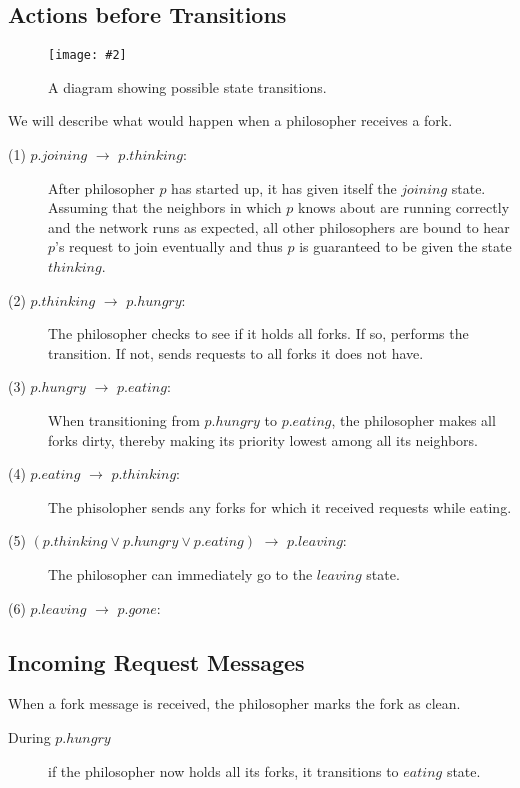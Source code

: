 \documentclass[11pt]{article}
\newcommand{\pic}[2]{\begin{center}\texttt{[image: \#2]}\end{center}}
\begin{document}
\subsection{Actions before Transitions}
\begin{figure}[H]
\pic{0.6}{diagram}
\label{fig:diagram}
\caption{A diagram showing possible state transitions.}
\end{figure}

We will describe what would happen when a philosopher receives a fork.
\begin{description}
\item[(1) $p.joining$ $\to$ $p.thinking$:] After philosopher $p$ has started up, it has given itself the $joining$ state. Assuming that the neighbors in which $p$ knows about are running correctly and the network runs as expected, all other philosophers are bound to hear $p$'s request to join eventually and thus $p$ is guaranteed to be given the state $thinking$.

\item[(2) $p.thinking$ $\to$ $p.hungry$:]
The philosopher checks to see if it holds all forks. If so, performs the transition. If not, sends requests to all forks it does not have.

\item[(3) $p.hungry$ $\to$ $p.eating$:] 
When transitioning from $p.hungry$ to $p.eating$, the philosopher makes all forks dirty, thereby making its priority lowest among all its neighbors.


\item[(4) $p.eating$ $\to$ $p.thinking$:]
The phisolopher sends any forks for which it received requests while eating.

\item[(5) $(p.thinking \vee p.hungry \vee p.eating)$ $\to$ $p.leaving$:]
The philosopher can immediately go to the $leaving$ state.

\item[(6) $p.leaving$ $\to$ $p.gone$:]
\end{description}
\subsection{Incoming Request Messages}
When a fork message is received, the philosopher marks the fork as clean.

\begin{description}
\item[During $p.hungry$] if the philosopher now holds all its forks, it transitions to $eating$ state.
\end{description}
\end{document}
